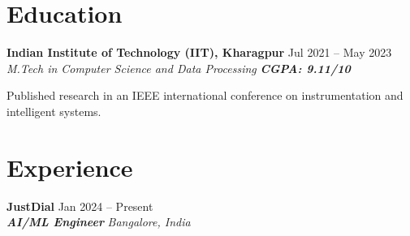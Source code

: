 \documentclass[10pt,a4paper]{article}
\newcommand{\resumeSubheading}[4]{
    \textbf{#1} \hfill #2 \\
    \textit{#3} \hfill \textit{#4}
}
\begin{document}
\vspace{-2pt}
\section{Education}
\resumeSubheading
{Indian Institute of Technology (IIT), Kharagpur}
{Jul 2021 -- May 2023}
{M.Tech in Computer Science and Data Processing}
{\textbf{CGPA: 9.11/10}}

\vspace{0pt}
{\small Published research in an IEEE international conference on instrumentation and intelligent systems.}

\vspace{-4pt}
\section{Experience}

\resumeSubheading
{JustDial}
{Jan 2024 -- Present}
{\textbf{AI/ML Engineer}}
{Bangalore, India}
\end{document}
